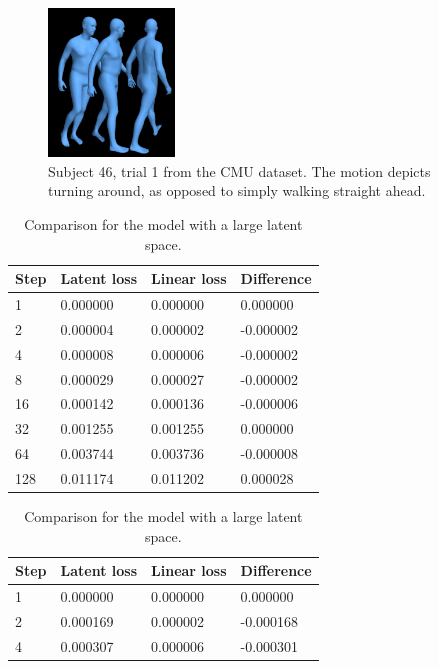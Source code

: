 \begin{figure}[h]
\centering
\includegraphics[width=0.3\textwidth]{img/46_01_turning}
\caption{Subject 46, trial 1 from the CMU dataset. The motion depicts turning around, as opposed to simply walking straight ahead.}
\label{fig:test-turning}
\end{figure}


\begin{table}[h]
    \begin{subtable}[h]{0.45\textwidth}
        \centering
        \begin{tabular}{@{}llll@{}}
        \toprule
        Step & Latent loss & Linear loss & Difference \\ \midrule
1 & 0.000000 & 0.000000 & 0.000000 \\
2 & 0.000004 & 0.000002 & -0.000002 \\
4 & 0.000008 & 0.000006 & -0.000002 \\
8 & 0.000029 & 0.000027 & -0.000002 \\
16 & 0.000142 & 0.000136 & -0.000006 \\
32 & 0.001255 & 0.001255 & 0.000000 \\
64 & 0.003744 & 0.003736 & -0.000008 \\
128 & 0.011174 & 0.011202 & 0.000028 \\ \bottomrule
        \end{tabular}
        \caption{Comparison for the model with a large latent space.}
        \label{tab:ae-eval-large}
    \end{subtable}
    \hfill
    \begin{subtable}[h]{0.45\textwidth}
        \centering
        \begin{tabular}{@{}llll@{}}
        \toprule
        Step & Latent loss & Linear loss & Difference \\ \midrule
1 & 0.000000 & 0.000000 & 0.000000 \\
2 & 0.000169 & 0.000002 & -0.000168 \\
4 & 0.000307 & 0.000006 & -0.000301 \\

\end{tabular}
\end{subtable}
\end{table}
